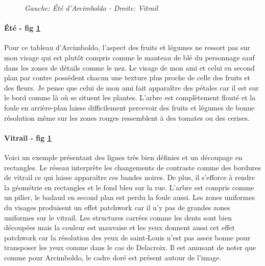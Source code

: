 \documentclass{article}
\begin{document}
\begin{figure}[!htb]
\begin{minipage}{0.25\textwidth}
\end{minipage}
\caption{\textit{Gauche:  Été d'Arcimboldo - Droite: Vitrail}}
\label{fig:set_4}
\end{figure}

\paragraph*{Été - fig \ref{fig:set_4}} Pour ce tableau d'Arcimboldo, l'aspect des fruits et légumes ne ressort pas sur mon visage qui est plutôt compris comme le manteau de blé du personnage sauf dans les zones de détails comme le nez. Le visage de mon ami et celui en second plan par contre possèdent chacun une texture plus proche de celle des fruits et des fleurs. Je pense que celui de mon ami fait apparaître des pétales car il est sur le bord comme là où se situent les plantes. L'arbre est complètement flouté et la foule en arrière-plan laisse difficilement percevoir des fruits et légumes de bonne résolution même sur les zones rouges ressemblent à des tomates ou des cerises.

\paragraph*{Vitrail - fig \ref{fig:set_4}} Voici un exemple présentant des lignes très bien définies et un découpage en rectangles. Le réseau interprète les changements de contraste comme des bordures de vitrail ce qui laisse apparaître ces bandes noires. De plus, il s'efforce à rendre la géométrie en rectangles et le fond bleu sur la rue. L'arbre est compris comme un pilier, le badaud en second plan est perdu la foule aussi. Les zones uniformes du visages produisent un effet patchwork car il n'y pas de grandes zones uniformes sur le vitrail. Les structures carrées comme les dents sont bien découpées mais la couleur est mauvaise et les yeux donnent aussi cet effet patchwork car la résolution des yeux de saint-Louis n'est pas assez bonne pour transposer les yeux comme dans le cas de Delacroix. Il est amusant de noter que comme pour Arcimboldo, le cadre doré est présent autour de l'image.
\end{document}
